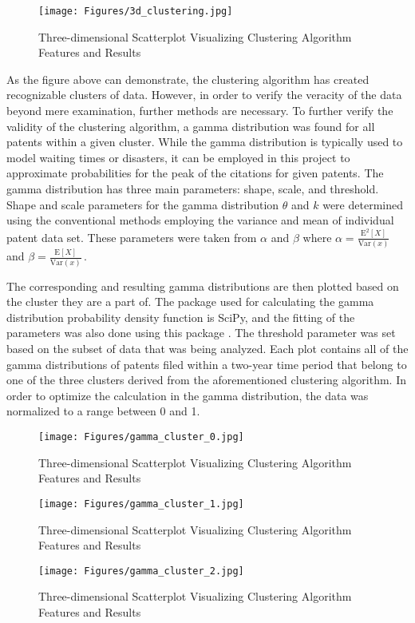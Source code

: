 \begin{figure}[H]
    \centering
    \texttt{[image: Figures/3d\_clustering.jpg]}
    \caption{Three-dimensional Scatterplot Visualizing Clustering Algorithm Features and Results}
    \label{fig:my_first_figure}
\end{figure}

As the figure above can demonstrate, the clustering algorithm has created recognizable clusters of data. However, in order to verify the veracity of the data beyond mere examination, further methods are necessary. To further verify the validity of the clustering algorithm, a gamma distribution was found for all patents within a given cluster. 
While the gamma distribution is typically used to model waiting times or disasters, it can be employed in this project to approximate probabilities for the peak of the citations for given patents. The gamma distribution has three main parameters: shape, scale, and threshold. Shape and scale parameters for the gamma distribution $\theta$ and \(k\) were determined using the conventional methods employing the variance and mean of individual patent data set. 
These parameters were taken from $\alpha$ and $\beta$ where \(\alpha = \frac{\mathrm{E^2}[X]}{\mathrm{Var}(x)}\,\) and \(\beta = \frac{\mathrm{E}[X]}{\mathrm{Var}(x)}\,\).

The corresponding and resulting gamma distributions are then plotted based on the cluster they are a part of. The package used for calculating the gamma distribution probability density function is SciPy, and the fitting of the parameters was also done using this package \citep{2020SciPy-NMeth}. The threshold parameter was set based on the subset of data that was being analyzed. Each plot contains all of the gamma distributions of patents filed within a two-year time period that belong to one of the three clusters derived from the aforementioned clustering algorithm. In order to optimize the calculation in the gamma distribution, the data was normalized to a range between 0 and 1. 
\begin{figure}[H]
    \centering
    \texttt{[image: Figures/gamma\_cluster\_0.jpg]}
    \caption{Three-dimensional Scatterplot Visualizing Clustering Algorithm Features and Results}
    \label{fig:my_first_figure}
\end{figure}
\begin{figure}[H]
    \centering
    \texttt{[image: Figures/gamma\_cluster\_1.jpg]}
    \caption{Three-dimensional Scatterplot Visualizing Clustering Algorithm Features and Results}
    \label{fig:my_first_figure}
\end{figure}
\begin{figure}[H]
    \centering
    \texttt{[image: Figures/gamma\_cluster\_2.jpg]}
    \caption{Three-dimensional Scatterplot Visualizing Clustering Algorithm Features and Results}
    \label{fig:my_first_figure}
\end{figure}

